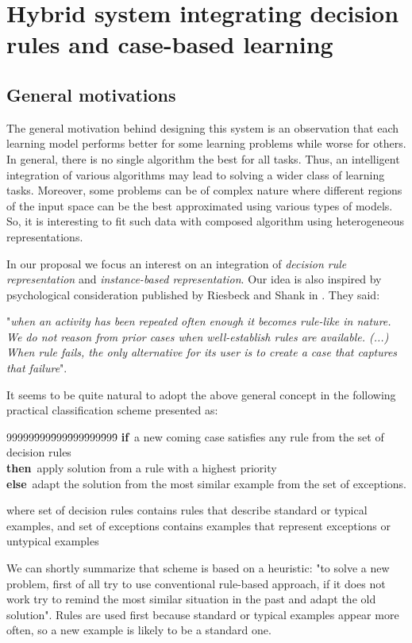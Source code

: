 \documentclass{article}
\newcommand{\bo}{\footnotesize \bf}
\newcommand{\no}{\footnotesize}
\newenvironment{algo}{\newcommand{\B}{{\bo begin}}
\newcommand{\DO}{{\bo do}~} \newcommand{\E}{{\bo end}}
\newcommand{\FOR}{{\bo for}~} \newcommand{\IF}{{\bo if}~}
\newcommand{\THEN}{{\bo then}~} \newcommand{\ELSE}{{\bo else}~}
\newcommand{\REPEAT}{{\bo repeat}~}
\newcommand{\UNTIL}{{\bo until}~}
\small
\no \begin{tabbing}
99999\= 999\= 999\= 999\= 999\= 999\= \+ \+ \kill}{\end{tabbing}
\normalsize}
\begin{document}
\section{Hybrid system integrating decision rules and case-based learning}

\subsection{General motivations}

The general motivation behind designing this system is an
observation that each learning model performs better for some
learning problems while worse for others. In general, there is no
single algorithm the best for all tasks. Thus, an intelligent
integration of various algorithms may lead to solving a wider
class of learning tasks. Moreover, some problems can be of complex
nature where different regions of the input space can be the best
approximated using various types of models. So, it is interesting
to fit such data with composed algorithm using heterogeneous
representations.

In our proposal we focus an interest on an integration of {\em
decision rule representation} and {\em instance-based
representation}. Our idea is also inspired by psychological
consideration published by Riesbeck and Shank in \cite{Shank}.
They said:

"{\em when an activity has been repeated often enough it becomes rule-like
in nature. We do not reason from prior cases when well-establish rules are
available. (...) When rule fails, the only alternative for its user is to
create a case that captures that failure}".

It seems to be quite natural to adopt the above general concept in
the following practical classification scheme presented as:

\begin{algo}
\< \IF a new coming case satisfies any rule from the set of decision rules\\
\< \THEN apply solution from a rule with a highest priority\\
\< \ELSE adapt the solution from the most similar example from the set of exceptions.
\end{algo}

\noindent where set of decision rules contains rules that describe standard
or typical examples, and set of exceptions contains examples that represent
exceptions or untypical examples

We can shortly summarize that scheme is based on a heuristic: "to
solve a new problem, first of all try to use conventional
rule-based approach, if it does not work try to remind the most
similar situation in the past and adapt the old solution". Rules
are used first because standard or typical examples appear more
often, so a new example is likely to be a standard one.
\end{document}
